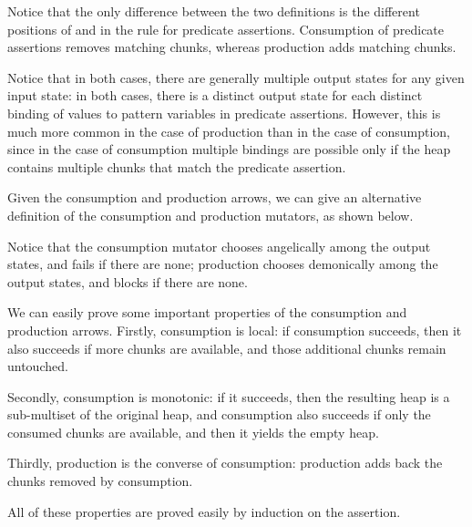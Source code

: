 \documentclass{CSML}
\newcommand{\display}[1]{}
\theoremstyle{definition}\newtheorem{notation}[thm]{Notation}
\theoremstyle{plain}\newtheorem{satz}[thm]{Satz}
\begin{document}
Notice that the only difference between the two definitions is 
the different positions of  and  in the rule for 
predicate assertions. Consumption of predicate assertions removes matching chunks, whereas production adds matching chunks.

Notice that in both cases, there are generally multiple output states for any given input state: in both cases,
there is a distinct output state for each distinct binding of values to pattern variables in predicate assertions. However, this is much
more common in the case of production than in the case of consumption, since in the case of consumption multiple bindings are possible only
if the heap contains multiple chunks that match the predicate assertion.

Given the consumption and production arrows, we can give an alternative definition of the consumption and production mutators, as shown below.

\begin{lem}

\end{lem}

Notice that the consumption mutator chooses angelically among the output states, and fails if there are none; production chooses demonically
among the output states, and blocks if there are none.

We can easily prove some important properties of the consumption and production arrows.
Firstly, consumption is local: if consumption succeeds, then it also succeeds if more chunks are available, and those additional chunks
remain untouched.
\begin{lem}\label{lemma:conlocal}
\display{(s, h) \xrightarrow{a}_\mathsf{c} (s', h') \Rightarrow (s, h \uplus h'') \xrightarrow{a}_\mathsf{c} (s', h' \uplus h'')}
\end{lem}

Secondly, consumption is monotonic: if it succeeds, then the resulting heap is a sub-multiset of the original heap, and
consumption also succeeds if only the consumed chunks are available, and then it yields the empty heap.
\begin{lem}\label{lemma:conadd}
\display{(s, h) \xrightarrow{a}_\mathsf{c} (s', h') \Rightarrow \exists h''.\;h = h' \uplus h'' \land (s, h'') \xrightarrow{a}_\mathsf{c} (s', \mathbf{0})}
\end{lem}

Thirdly,
production is the converse of consumption: production adds back the chunks removed by consumption.
\begin{lem}\label{lemma:conprod}
\display{(s, h) \xrightarrow{a}_\mathsf{c} (s', \mathbf{0}) \Rightarrow (s, h'') \xrightarrow{a}_\mathsf{p} (s', h'' \uplus h)}
\end{lem}
All of these properties are proved easily
by induction on the assertion.
\end{document}
